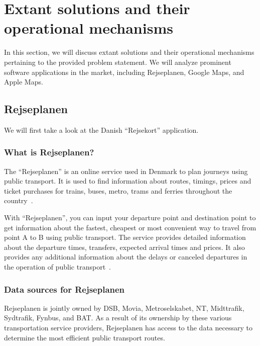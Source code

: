 \section{Extant solutions and their operational mechanisms}\label{sec:extant-solutions-and-their-operational-mechanisms}

In this section, we will discuss extant solutions and their operational mechanisms pertaining to the provided problem
statement.
We will analyze prominent software applications in the market, including Rejseplanen, Google Maps, and Apple Maps.

\subsection{Rejseplanen}\label{subsec:rejseplanen2}

We will first take a look at the Danish ``Rejsekort'' application.

\subsubsection{What is Rejseplanen?}

The ``Rejseplanen'' is an online service used in Denmark to plan journeys using public transport.
It is used to find information about routes, timings, prices and ticket purchases for trains, buses, metro, trams and
ferries throughout the country~\cite{rejseplanen2023}.

With ``Rejseplanen'', you can input your departure point and destination point to get information about the fastest,
cheapest or most convenient way to travel from point A to B using public transport.
The service provides detailed information about the departure times, transfers, expected arrival times and prices.
It also provides any additional information about the delays or canceled departures in the operation of public
transport~\cite{rejseplanen2023}.

\subsubsection{Data sources for Rejseplanen}\label{subsubsec:where-does-rejseplanen-get-their-data-from?}

Rejseplanen is jointly owned by DSB, Movia, Metroselskabet, NT, Midttrafik, Sydtrafik, Fynbus, and BAT\@.
As a result of its ownership by these various transportation service providers, Rejseplanen has access to the data
necessary to determine the most efficient public transport routes.

